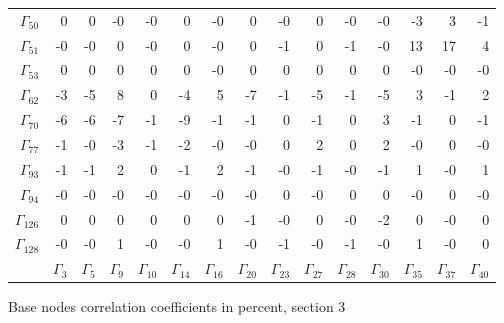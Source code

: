 {\begin{table}
\begin{center}
\begin{minipage}{\linewidth}
\begin{center}
\begin{envsmall}
\begin{center}
\begin{tabular}{rrrrrrrrrrrrrrr}
\( \Gamma_{50} \) &    0 &    0 &   -0 &   -0 &    0 &   -0 &    0 &   -0 &    0 &   -0 &   -0 &   -3 &    3 &   -1 \\
\( \Gamma_{51} \) &   -0 &   -0 &    0 &   -0 &    0 &   -0 &    0 &   -1 &    0 &   -1 &   -0 &   13 &   17 &    4 \\
\( \Gamma_{53} \) &    0 &    0 &    0 &    0 &    0 &   -0 &    0 &    0 &    0 &    0 &    0 &   -0 &   -0 &   -0 \\
\( \Gamma_{62} \) &   -3 &   -5 &    8 &    0 &   -4 &    5 &   -7 &   -1 &   -5 &   -1 &   -5 &    3 &   -1 &    2 \\
\( \Gamma_{70} \) &   -6 &   -6 &   -7 &   -1 &   -9 &   -1 &   -1 &    0 &   -1 &    0 &    3 &   -1 &    0 &   -1 \\
\( \Gamma_{77} \) &   -1 &   -0 &   -3 &   -1 &   -2 &   -0 &   -0 &    0 &    2 &    0 &    2 &   -0 &    0 &   -0 \\
\( \Gamma_{93} \) &   -1 &   -1 &    2 &    0 &   -1 &    2 &   -1 &   -0 &   -1 &   -0 &   -1 &    1 &   -0 &    1 \\
\( \Gamma_{94} \) &   -0 &   -0 &   -0 &   -0 &   -0 &   -0 &   -0 &    0 &   -0 &    0 &    0 &   -0 &    0 &   -0 \\
\( \Gamma_{126} \) &    0 &    0 &    0 &    0 &    0 &    0 &   -1 &   -0 &    0 &   -0 &   -2 &    0 &   -0 &    0 \\
\( \Gamma_{128} \) &   -0 &   -0 &    1 &   -0 &   -0 &    1 &   -0 &   -1 &   -0 &   -1 &   -0 &    1 &   -0 &    0 \\
 & \( \Gamma_{3} \) & \( \Gamma_{5} \) & \( \Gamma_{9} \) & \( \Gamma_{10} \) & \( \Gamma_{14} \) & \( \Gamma_{16} \) & \( \Gamma_{20} \) & \( \Gamma_{23} \) & \( \Gamma_{27} \) & \( \Gamma_{28} \) & \( \Gamma_{30} \) & \( \Gamma_{35} \) & \( \Gamma_{37} \) & \( \Gamma_{40} \)
\\\hline
\end{tabular}
\end{center}
\end{envsmall}
\ifhevea\else
\end{center}
\end{minipage}
\fi
\end{center}
\ifhevea\end{table}\fi
\ifhevea\begin{table}\fi%
\begin{center}
\ifhevea
\caption{Base nodes correlation coefficients in percent, section 3\label{tab:tau:br-fit-corr3}}%

\end{center}
\end{table}}
